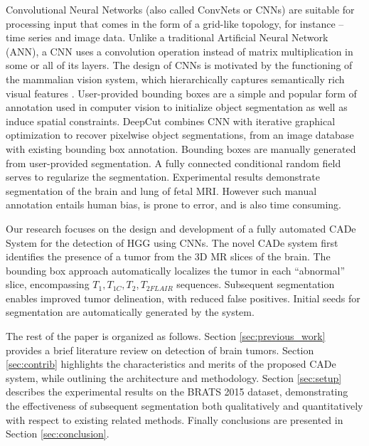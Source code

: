 \documentclass[journal,twocolumn]{IEEEtran}
\begin{document}
Convolutional Neural Networks (also called ConvNets or CNNs) \cite{Lecun1998} are  suitable for processing input that comes in the form of a grid-like topology, for instance -- time series and image data. Unlike  a traditional Artificial Neural Network (ANN), a CNN uses a convolution operation instead of  matrix multiplication in some or all of its layers. The design of  CNNs  is motivated by the functioning of the mammalian vision system, which hierarchically captures semantically rich visual features \cite{Hubel1962, Fukushima1980, Lecun1998}. User-provided bounding boxes are a simple and popular form of annotation used in computer vision to initialize object segmentation as well as induce spatial constraints. DeepCut \cite{Deepcut-2017} combines CNN with  iterative  graphical optimization  to recover pixelwise object segmentations, from an image database with existing bounding box annotation. Bounding  boxes are manually generated from user-provided segmentation. A fully connected conditional random field serves to regularize the segmentation. Experimental results demonstrate segmentation of the brain and lung of fetal MRI. However such manual annotation entails human bias, is prone to error, and is also time consuming.

Our research focuses on the design and development of a  fully automated CADe System for the detection of HGG using CNNs. The novel CADe system first identifies the presence of a tumor from the 3D MR slices of the brain. The bounding box approach automatically localizes the tumor in each ``abnormal'' slice, encompassing $T_1, T_{1C}, T_2, T_{2FLAIR}$ sequences. Subsequent segmentation enables improved tumor delineation, with reduced false positives. Initial seeds for segmentation are automatically generated by the system.

The rest  of the paper is organized as follows.  Section \ref{sec:previous_work} provides a brief literature review  on detection of brain tumors.  Section \ref{sec:contrib} highlights the characteristics and merits of the proposed CADe  system, while outlining the architecture and methodology.   Section \ref{sec:setup} describes the experimental results  on the BRATS 2015 dataset, demonstrating the effectiveness of subsequent segmentation both qualitatively and quantitatively with respect to existing related methods. Finally conclusions are presented in Section \ref{sec:conclusion}.
\end{document}
